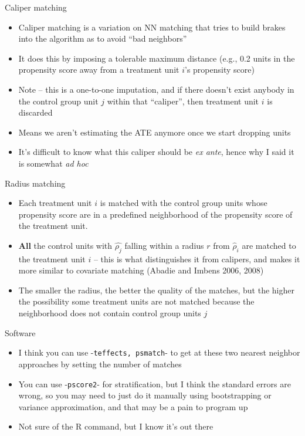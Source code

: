 \documentclass{beamer}
\begin{document}
\begin{frame}{Caliper matching}
	
	\begin{itemize}
	\item Caliper matching is a variation on NN matching that tries to build brakes into the algorithm as to avoid ``bad neighbors''
	\item It does this by imposing a tolerable maximum distance (e.g., 0.2 units in the propensity score away from a treatment unit $i$'s propensity score)
	\item Note -- this is a one-to-one imputation, and if there doesn't exist anybody in the control group unit $j$ within that ``caliper'', then treatment unit $i$ is discarded
	\item Means we aren't estimating the ATE anymore once we start dropping units
	\item It's difficult to know what this caliper should be \emph{ex ante}, hence why I said it is somewhat \emph{ad hoc}
	\end{itemize}

\end{frame}


\begin{frame}{Radius matching}
	
	
		\begin{itemize}
		\item Each treatment unit $i$ is matched with the control group units whose propensity score are in a predefined neighborhood of the propensity score of the treatment unit.
		\item \textbf{All} the control units with $\widehat{\rho_j}$ falling within a radius $r$ from $\widehat{\rho}_i$ are matched to the treatment unit $i$ -- this is what distinguishes it from calipers, and makes it more similar to covariate matching (Abadie and Imbens 2006, 2008)
		\item The smaller the radius, the better the quality of the matches, but the higher the possibility some treatment units are not matched because the neighborhood does not contain control group units $j$
		\end{itemize}
		
\end{frame}

\begin{frame}{Software}

\begin{itemize}
\item I think you can use -\texttt{teffects, psmatch}- to get at these two nearest neighbor approaches by setting the number of matches
\item You can use -\texttt{pscore2}- for stratification, but I think the standard errors are wrong, so you may need to just do it manually using bootstrapping or variance approximation, and that may be a pain to program up
\item Not sure of the R command, but I know it's out there
\end{itemize}

\end{frame}
\end{document}
